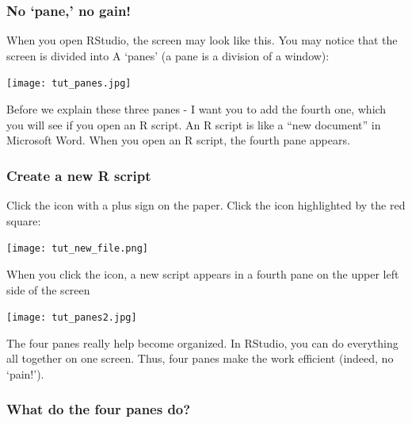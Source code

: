 \documentclass[
]{book}
\begin{document}
\hypertarget{no-pane-no-gain}{%
\subsubsection{No `pane,' no gain!}\label{no-pane-no-gain}}

When you open RStudio, the screen may look like this. You may notice that the screen is divided into A `panes' (a pane is a division of a window):

\texttt{[image: tut\_panes.jpg]}

Before we explain these three panes - I want you to add the fourth one, which you will see if you open an R script. An R script is like a ``new document'' in Microsoft Word. When you open an R script, the fourth pane appears.

\hypertarget{create-a-new-r-script}{%
\subsubsection{Create a new R script}\label{create-a-new-r-script}}

Click the icon with a plus sign on the paper. Click the icon highlighted by the red square:

\texttt{[image: tut\_new\_file.png]}

When you click the icon, a new script appears in a fourth pane on the upper left side of the screen

\texttt{[image: tut\_panes2.jpg]}

The four panes really help become organized. In RStudio, you can do everything all together on one screen. Thus, four panes make the work efficient (indeed, no `pain!').

\hypertarget{what-do-the-four-panes-do}{%
\subsubsection{What do the four panes do?}\label{what-do-the-four-panes-do}}
\end{document}
